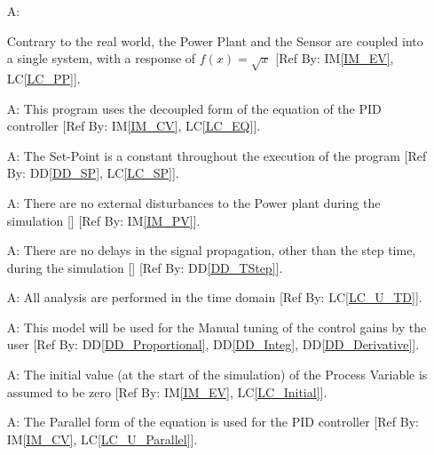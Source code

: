 \documentclass[12pt]{article}
\newcommand{\ddref}[1]{DD\ref{#1}}
\newcounter{assumpnum} %
\newcommand{\iref}[1]{IM\ref{#1}}
\newcommand{\lcref}[1]{LC\ref{#1}}
\begin{document}
\begin{itemize}

\item[A\refstepcounter{assumpnum}\theassumpnum \label{A_PP}:]
	
    Contrary to the real world, the Power Plant and the Sensor are coupled 
    into a single system, with a response of $f(x) = \sqrt x$ [Ref By: 
    \iref{IM_EV}, \lcref{LC_PP}].

\item[A\refstepcounter{assumpnum}\theassumpnum \label{A_EQ}:] This program uses
 the decoupled form of the equation of the PID controller [Ref By: \iref{IM_CV}, 
    \lcref{LC_EQ}].

\item[A\refstepcounter{assumpnum}\theassumpnum \label{A_SP}:] The Set-Point is 
a constant throughout the execution of the program [Ref By: \ddref{DD_SP}, 
    \lcref{LC_SP}].

\item[A\refstepcounter{assumpnum}\theassumpnum \label{A_Attn}:] There are no 
external disturbances to the Power plant during the simulation [\cite{PID_Wiki}]
[Ref By: \iref{IM_PV}].

\item[A\refstepcounter{assumpnum}\theassumpnum \label{A_Delay}:] There are no 
delays in the signal propagation, other than the step time,
during the simulation [\cite{PID_Wiki}] [Ref By: \ddref{DD_TStep}].

\item[A\refstepcounter{assumpnum}\theassumpnum \label{A_Domain}:] All analysis 
are performed in the time domain [Ref By: \lcref{LC_U_TD}].

\item[A\refstepcounter{assumpnum}\theassumpnum \label{A_Tuning}:] This model 
will be used for the Manual tuning of the control gains by the user 
[Ref By: \ddref{DD_Proportional}, \ddref{DD_Integ}, \ddref{DD_Derivative}].

\item[A\refstepcounter{assumpnum}\theassumpnum \label{A_Initial}:] The initial
value (at the start of the simulation) of the Process Variable is assumed to be 
zero [Ref By: \iref{IM_EV}, \lcref{LC_Initial}].

\item[A\refstepcounter{assumpnum}\theassumpnum \label{A_Parallel}:] The Parallel
form of the equation is used for the PID controller 
[Ref By: \iref{IM_CV}, \lcref{LC_U_Parallel}].

\end{itemize}
\end{document}
